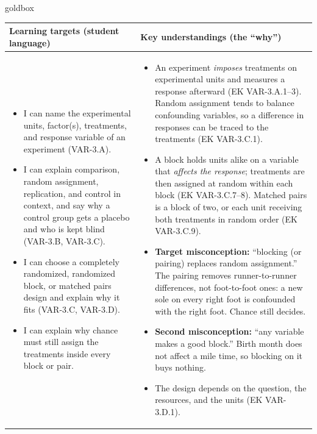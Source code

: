 \documentclass[10pt]{article}
\begin{document}
\renewcommand{\arraystretch}{1.4}
\boxguard
\begin{skillbox}{goldbox}
\begin{tabularx}{\linewidth}{@{}X|X@{}}
\textbf{Learning targets (student language)} & \textbf{Key understandings (the ``why'')} \\[2pt]
\hline
\vspace{-6pt}
\begin{itemize}[leftmargin=1.1em, nosep, after=\vspace{2pt}]
  \item I can name the experimental units, factor(s), treatments, and response variable of an
        experiment (VAR-3.A).
  \item I can explain comparison, random assignment, replication, and control in context, and
        say why a control group gets a placebo and who is kept blind (VAR-3.B, VAR-3.C).
  \item I can choose a completely randomized, randomized block, or matched pairs design and
        explain why it fits (VAR-3.C, VAR-3.D).
  \item I can explain why chance must still assign the treatments inside every block or pair.
\end{itemize}
&
\vspace{-6pt}
\begin{itemize}[leftmargin=1.1em, nosep, after=\vspace{2pt}]
  \item An experiment \emph{imposes} treatments on experimental units and measures a response
        afterward (EK VAR-3.A.1--3). Random assignment tends to balance confounding variables,
        so a difference in responses can be traced to the treatments (EK VAR-3.C.1).
  \item A block holds units alike on a variable that \emph{affects the response}; treatments
        are then assigned at random within each block (EK VAR-3.C.7--8). Matched pairs is a
        block of two, or each unit receiving both treatments in random order (EK VAR-3.C.9).
  \item \textbf{Target misconception:} ``blocking (or pairing) replaces random assignment.''
        The pairing removes runner-to-runner differences, not foot-to-foot ones: a new sole on
        every right foot is confounded with the right foot. Chance still decides.
  \item \textbf{Second misconception:} ``any variable makes a good block.'' Birth month does
        not affect a mile time, so blocking on it buys nothing.
  \item The design depends on the question, the resources, and the units (EK VAR-3.D.1).
\end{itemize}
\end{tabularx}
\end{skillbox}
\end{document}
